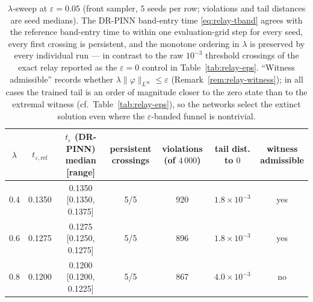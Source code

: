 \documentclass[11pt]{elsarticle}
\theoremstyle{definition}
\theoremstyle{remark}
\numberwithin{equation}{section}
\begin{document}
\begin{table}[htbp]
  \centering
  \small
  \setlength{\tabcolsep}{3pt}
  \begin{tabular}{ccccccc}
    \toprule
    $\lambda$ & $t_{\varepsilon,\mathrm{ref}}$ &
    \shortstack{$t_\varepsilon$ (DR-PINN)\\median [range]} &
    \shortstack{persistent\\crossings} &
    \shortstack{violations\\(of $4\,000$)} &
    \shortstack{tail dist.\\to $0$} &
    \shortstack{witness\\admissible} \\
    \midrule
    0.4 & 0.1350 & 0.1350 [0.1350, 0.1375] & 5/5 & 920 & $1.8\times10^{-3}$ & yes \\
    0.6 & 0.1275 & 0.1275 [0.1250, 0.1275] & 5/5 & 896 & $1.8\times10^{-3}$ & yes \\
    0.8 & 0.1200 & 0.1200 [0.1200, 0.1225] & 5/5 & 867 & $4.0\times10^{-3}$ & no \\
    \bottomrule
  \end{tabular}
  \caption{$\lambda$-sweep at $\varepsilon=0.05$ (front sampler, $5$
    seeds per row; violations and tail distances are seed medians). The
    DR-PINN band-entry time \eqref{eq:relay-tband} agrees with the
    reference band-entry time to within one evaluation-grid step for
    every seed, every first crossing is persistent, and the monotone
    ordering in $\lambda$ is preserved by every individual run --- in
    contrast to the raw $10^{-3}$ threshold crossings of the exact relay
    reported as the $\varepsilon=0$ control in
    Table~\ref{tab:relay-eps}. ``Witness admissible'' records whether
    $\lambda\|\varphi\|_{L^\infty}\le\varepsilon$
    (Remark~\ref{rem:relay-witness}); in all cases the trained tail is an
    order of magnitude closer to the zero state than to the extremal
    witness (cf.\ Table~\ref{tab:relay-eps}), so the networks select the
    extinct solution even where the $\varepsilon$-banded funnel is
    nontrivial.}
  \label{tab:relay-extinction}
\end{table}
\end{document}
